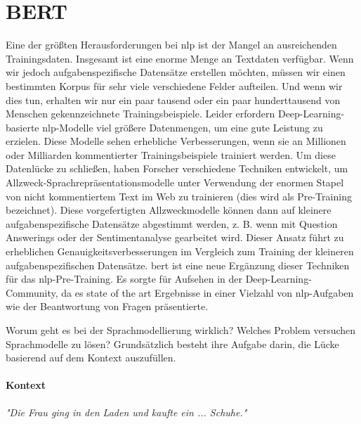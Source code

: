 \documentclass[
        ngerman,
        paper=a4,
        numbers=noendperiod,
]{scrreprt}
\begin{document}
\section{BERT}
Eine der größten Herausforderungen bei \ac{nlp} ist der Mangel an ausreichenden Trainingsdaten. Insgesamt ist eine enorme Menge an Textdaten verfügbar. Wenn wir jedoch aufgabenspezifische Datensätze erstellen möchten, müssen wir einen bestimmten Korpus für sehr viele verschiedene Felder aufteilen. Und wenn wir dies tun, erhalten wir nur ein paar tausend oder ein paar hunderttausend von Menschen gekennzeichnete Trainingsbeispiele. Leider erfordern Deep-Learning-basierte \ac{nlp}-Modelle viel größere Datenmengen, um eine gute Leistung zu erzielen. Diese Modelle sehen erhebliche Verbesserungen, wenn sie an Millionen oder Milliarden kommentierter Trainingsbeispiele trainiert werden. Um diese Datenlücke zu schließen, haben Forscher verschiedene Techniken entwickelt, um Allzweck-Sprachrepräsentationsmodelle unter Verwendung der enormen Stapel von nicht kommentiertem Text im Web zu trainieren (dies wird als Pre-Training bezeichnet). Diese vorgefertigten Allzweckmodelle können dann auf kleinere aufgabenspezifische Datensätze abgestimmt werden, z. B. wenn mit Question Answerings oder der Sentimentanalyse gearbeitet wird. Dieser Ansatz führt zu erheblichen Genauigkeitsverbesserungen im Vergleich zum Training der kleineren aufgabenspezifischen Datensätze. \ac{bert} \citep{Devlin2018BERT:Understanding} ist eine neue Ergänzung dieser Techniken für das \ac{nlp}-Pre-Training. Es sorgte für Aufsehen in der Deep-Learning-Community, da es state of the art Ergebnisse in einer Vielzahl von \ac{nlp}-Aufgaben wie der Beantwortung von Fragen präsentierte.




Worum geht es bei der Sprachmodellierung wirklich? Welches Problem versuchen Sprachmodelle zu lösen? Grundsätzlich besteht ihre Aufgabe darin, die Lücke basierend auf dem Kontext auszufüllen. 

\paragraph{Kontext} \textit{"Die Frau ging in den Laden und kaufte ein ... Schuhe."}
\newline
    
    
\end{document}
